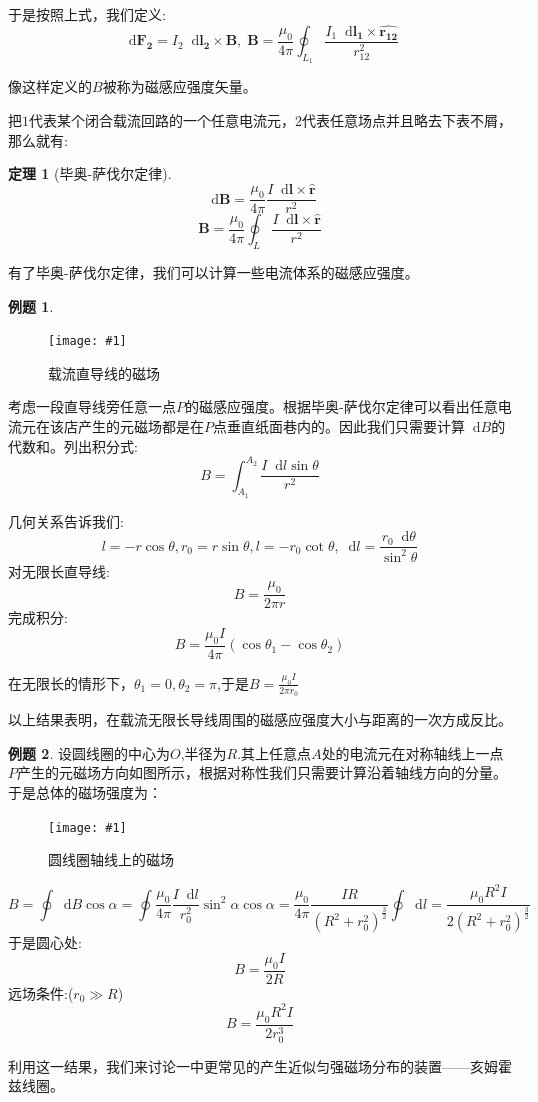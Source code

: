 \documentclass[12pt,a4paper,oneside]{report}
\newtheorem{theorem}{定理}[chapter]
\theoremstyle{definition}
\newtheorem{example}{例题}[chapter]
\theoremstyle{remark}
\newcommand{\insertfig}[3]{
    \begin{figure}[ht]
        \centering
        \texttt{[image: \#1]}
        \caption{#2}
        \label{fig:#1}
    \end{figure}
}
\renewcommand{\d}{\mathop{}\!\mathrm{d}}
\begin{document}
于是按照上式，我们定义:
\[
\d \mathbf{F_2} = I_2\d \mathbf{l_2}\times \mathbf{B}, \; \mathbf{B} = \frac{\mu_0}{4\pi}\oint_{L_1}\frac{I_1 \d \mathbf{l_1}\times {\mathbf{\hat{r_{12}}}}}{r^2_{12}}
\]

像这样定义的$B$被称为磁感应强度矢量。

把$1$代表某个闭合载流回路的一个任意电流元，$2$代表任意场点并且略去下表不屑，那么就有:
\begin{theorem}[毕奥-萨伐尔定律]
\[
\d \mathbf{B}=  \frac{\mu_0}{4\pi}
\frac{I \d \mathbf{l}\times {\mathbf{\hat{r}}}}{r^2}
\]
\[
\mathbf{B} = \frac{\mu_0}{4\pi}
\oint_L \frac{I \d \mathbf{l}\times {\mathbf{\hat{r}}}}{r^2}
\]
\end{theorem}

有了毕奥-萨伐尔定律，我们可以计算一些电流体系的磁感应强度。

\begin{example}
  \insertfig{2-2.png}{载流直导线的磁场}{0.25}
考虑一段直导线旁任意一点$P$的磁感应强度。根据毕奥-萨伐尔定律可以看出任意电流元在该店产生的元磁场都是在$P$点垂直纸面巷内的。因此我们只需要计算$\d B$的代数和。列出积分式:
\[
B = \int_{A_1}^{A_2}\frac{I\d l\sin\theta}{r^2}
\]

几何关系告诉我们:
\[
l=-r\cos\theta,r_0=r\sin\theta,l=-r_0\cot\theta,\d l = \frac{r_0 \d\theta}{\sin^2\theta}
\]
对无限长直导线:
\[
B = \frac{\mu_0}{2\pi r}
\]
完成积分:
\[
B = \frac{\mu_0 I}{4\pi}(\cos\theta_1-\cos\theta_2)
\]

在无限长的情形下，$\theta_1=0,\theta_2= \pi$,于是$B=\frac{\mu_0 I}{2\pi r_0}$

以上结果表明，在载流无限长导线周围的磁感应强度大小与距离的一次方成反比。

\end{example}

\begin{example}
设圆线圈的中心为$O$,半径为$R$.其上任意点$A$处的电流元在对称轴线上一点$P$产生的元磁场方向如图所示，根据对称性我们只需要计算沿着轴线方向的分量。于是总体的磁场强度为：

\insertfig{2-3.png}{圆线圈轴线上的磁场}{0.25}
\[
B=\oint\d B \cos \alpha =\oint \frac{\mu_0}{4\pi} \frac{I\d l}{r_0^2}\sin^2\alpha\cos\alpha = \frac{\mu_0}{4\pi}\frac{IR}{(R^2+r_0^2)^{\frac{3}{2}}}\oint \d l =\frac{\mu_0R^2I}{2(R^2+r_0^2)^{\frac{3}{2}}}
\]
于是圆心处:
\[
B=\frac{\mu_0 I}{2R}
\]
远场条件:($r_0 \gg R$)
\[
B=\frac{\mu_0R^2I}{2r_0^3}
\]
\end{example}

利用这一结果，我们来讨论一中更常见的产生近似匀强磁场分布的装置——亥姆霍兹线圈。
\end{document}
